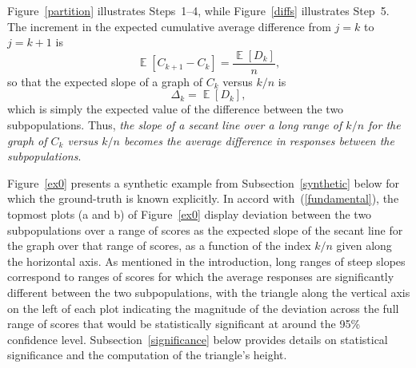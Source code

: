 \documentclass{article}
\DeclareMathOperator{\E}{\mathop{}\mathbb{E}}
\begin{document}
Figure~\ref{partition} illustrates Steps~1--4,
while Figure~\ref{diffs} illustrates Step~5.
The increment in the expected cumulative average difference
from $j = k$ to $j = k+1$ is
%
\begin{equation}
\label{fundamental}
\E[ C_{k+1} - C_k ] = \frac{\E[D_k]}{n},
\end{equation}
%
so that the expected slope of a graph of $C_k$ versus $k/n$ is
%
\begin{equation}
\label{delta}
\Delta_k = \E[D_k],
\end{equation}
%
which is simply the expected value of the difference
between the two subpopulations.
Thus, {\it the slope of a secant line over a long range of $k/n$
for the graph of $C_k$ versus $k/n$ becomes the average difference
in responses between the subpopulations}.

Figure~\ref{ex0} presents a synthetic example
from Subsection~\ref{synthetic} below for which the ground-truth
is known explicitly.
In accord with~(\ref{fundamental}),
the topmost plots (a and b) of Figure~\ref{ex0}
display deviation between the two subpopulations over a range of scores
as the expected slope of the secant line for the graph
over that range of scores, as a function of the index $k/n$
given along the horizontal axis.
As mentioned in the introduction,
long ranges of steep slopes correspond to ranges of scores for which
the average responses are significantly different
between the two subpopulations,
with the triangle along the vertical axis on the left of each plot
indicating the magnitude of the deviation across the full range of scores
that would be statistically significant at around the 95\% confidence level.
Subsection~\ref{significance} below provides details
on statistical significance and the computation of the triangle's height.
\end{document}
